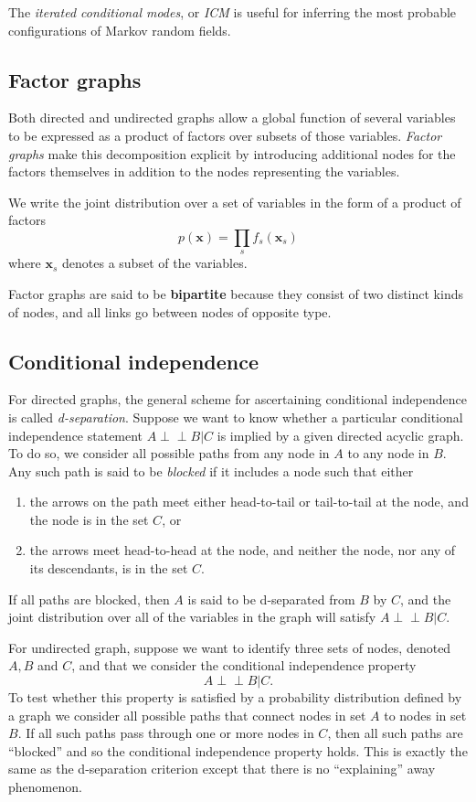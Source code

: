 \documentclass[a4paper]{book}
\def\ci{\perp\!\!\!\perp}
\renewcommand{\bf}{\mathbf}
\newcommand{\imp}[1]{\textit{#1}}
\begin{document}
The \imp{iterated conditional modes}, or \imp{ICM} is useful for inferring the most probable configurations of Markov random fields.
\subsection{Factor graphs}
Both directed and undirected graphs allow a global function of several variables to be expressed as a product of factors over subsets of those variables. \imp{Factor graphs} make this decomposition explicit by introducing additional nodes for the factors themselves in addition to the nodes representing the variables.

We write the joint distribution over a set of variables in the form of a product of factors
\begin{equation}
	p(\bf{x}) = \prod_{s} f_s(\bf{x}_s)
\end{equation}
where $\bf{x}_s$ denotes a subset of the variables.

Factor graphs are said to be \textbf{bipartite} because they consist of two distinct kinds of nodes, and all links go between nodes of opposite type.
\subsection{Conditional independence}
For directed graphs, the general scheme for ascertaining conditional independence is called \imp{d-separation}. Suppose we want to know whether a particular conditional independence statement $A \ci B|C$ is implied by a given directed acyclic graph. To do so, we consider all possible paths from any node in $A$ to any node in $B$. Any such path is said to be \imp{blocked} if it includes a node such that either
\begin{enumerate}
	\item the arrows on the path meet either head-to-tail or tail-to-tail at the node, and the node is in the set $C$, or
	\item the arrows meet head-to-head at the node, and neither the node, nor any of its descendants, is in the set $C$.
\end{enumerate}
If all paths are blocked, then $A$ is said to be d-separated from $B$ by $C$, and the joint distribution over all of the variables in the graph will satisfy $A\ci B|C$.

For undirected graph, suppose we want to identify three sets of nodes, denoted $A,B$ and $C$, and that we consider the conditional independence property
\begin{equation}
	A \ci B|C.
\end{equation}
To test whether this property is satisfied by a probability distribution defined by a graph we consider all possible paths that connect nodes in set $A$ to nodes in set $B$. If all such paths pass through one or more nodes in $C$, then all such paths are ``blocked'' and so the conditional independence property holds. This is exactly the same as the d-separation criterion except that there is no ``explaining'' away phenomenon.
\end{document}
